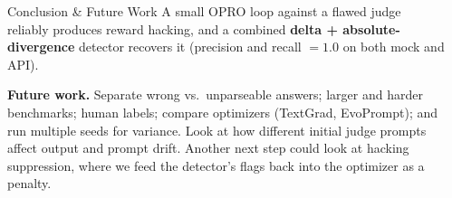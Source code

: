 \documentclass[final]{beamer}
\newlength{\sepwidth}
\newlength{\colwidth}
\newcommand{\separatorcolumn}{\begin{column}{\sepwidth}\end{column}}
\begin{document}
\begin{frame}[t]
\begin{columns}[t]
\begin{column}{\colwidth}
\begin{block}{Conclusion \& Future Work}
A small OPRO loop against a flawed judge reliably produces reward hacking, and a
combined \textbf{delta + absolute-divergence} detector recovers it (precision
and recall $=1.0$ on both mock and API).

\textbf{Future work.} Separate wrong vs.\ unparseable answers; larger and harder
benchmarks; human labels; compare optimizers (TextGrad, EvoPrompt); and run
multiple seeds for variance. Look at how different initial judge prompts affect output and prompt drift. 
Another next step could look at hacking suppression, where we feed the detector's flags back into the optimizer as a penalty. 

\end{block}

\end{column}

\separatorcolumn

\end{columns}
\end{frame}
\end{document}
